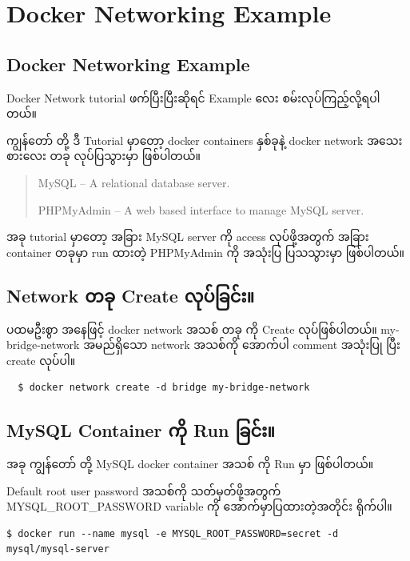 \documentclass{article}
\begin{document}
\section{Docker Networking Example}\label{docker-networking-example}

\subsection{Docker Networking
Example}\label{docker-networking-example-1}

Docker Network tutorial ဖက်ပြီးပြီးဆိုရင် Example လေး
စမ်းလုပ်ကြည့်လို့ရပါတယ်။

ကျွန်တော် တို့ ဒီ Tutorial မှာတော့ docker containers နှစ်ခုနဲ့ docker
network အသေးစားလေး တခု လုပ်ပြသွားမှာ ဖြစ်ပါတယ်။

\begin{quote}
MySQL -- A relational database server.

PHPMyAdmin -- A web based interface to manage MySQL server.
\end{quote}

အခု tutorial မှာတော့ အခြား MySQL server ကို access လုပ်ဖို့အတွက် အခြား
container တခုမှာ run ထားတဲ့ PHPMyAdmin ကို အသုံးပြ ပြသသွားမှာ ဖြစ်ပါတယ်။

\subsection{Network တခု Create
လုပ်ခြင်း။}\label{network-ux1010ux1001-create-ux101cux1015ux1001ux1004}

ပထမဦးစွာ အနေဖြင့် docker network အသစ် တခု ကို Create လုပ်ဖြစ်ပါတယ်။
my-bridge-network အမည်ရှိသော network အသစ်ကို အောက်ပါ comment အသုံးပြု
ပြီး create လုပ်ပါ။

\begin{verbatim}
  $ docker network create -d bridge my-bridge-network
\end{verbatim}

\subsection{MySQL Container ကို Run
ခြင်း။}\label{mysql-container-ux1000-run-ux1001ux1004}

အခု ကျွန်တော် တို့ MySQL docker container အသစ် ကို Run မှာ ဖြစ်ပါတယ်။

Default root user password အသစ်ကို သတ်မှတ်ဖို့အတွက်
MYSQL\_ROOT\_PASSWORD variable ကို အောက်မှာပြထားတဲ့အတိုင်း ရိုက်ပါ။

\begin{verbatim}
$ docker run --name mysql -e MYSQL_ROOT_PASSWORD=secret -d mysql/mysql-server
\end{verbatim}
\end{document}

